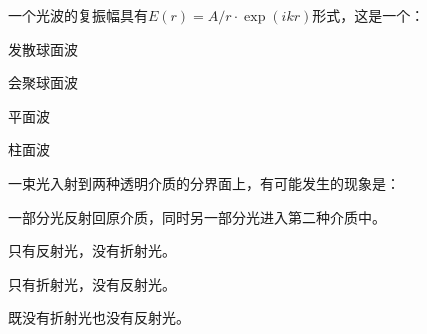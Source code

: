 \documentclass[standard, analysis, notocnum]{ExBook}
\newcommand{\answerarea}[1][8cm]{%
  \par\vspace{2mm}%
  \noindent{\color{themeColor!35}\rule{\linewidth}{0.4pt}}\par
  \noindent\begin{minipage}[t][#1][t]{\linewidth}\vspace{0pt}\end{minipage}\par
  \noindent{\color{themeColor!35}\rule{\linewidth}{0.4pt}}\par
}
\begin{document}
\begin{qitems}
\begin{bbox}
\answerarea[3.5cm]
\end{bbox}
\begin{bbox}
\qitem 一个光波的复振幅具有$E(r)=A/r\cdot \exp (ikr)$形式，这是一个：
\par\noindent\hspace{2em}发散球面波
\par\noindent\hspace{2em}会聚球面波
\par\noindent\hspace{2em}平面波
\par\noindent\hspace{2em}柱面波
\answerarea[3.5cm]
\end{bbox}
\begin{bbox}
\qitem 一束光入射到两种透明介质的分界面上，有可能发生的现象是：
\par\noindent\hspace{2em}一部分光反射回原介质，同时另一部分光进入第二种介质中。
\par\noindent\hspace{2em}只有反射光，没有折射光。
\par\noindent\hspace{2em}只有折射光，没有反射光。
\par\noindent\hspace{2em}既没有折射光也没有反射光。
\answerarea[3.5cm]
\end{bbox}
\end{qitems}
\end{document}
